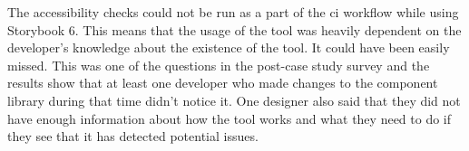 \documentclass{master_thesis}
\begin{document}
The accessibility checks could not be run as a part of the \ac{ci} workflow while using Storybook 6. This means that the usage of the tool was heavily dependent on the developer's knowledge about the existence of the tool. It could have been easily missed. This was one of the questions in the post-case study survey and the results show that at least one developer who made changes to the component library during that time didn't notice it. One designer also said that they did not have enough information about how the tool works and what they need to do if they see that it has detected potential issues.
\end{document}
